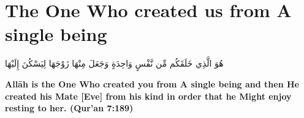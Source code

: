 \chapter{The One Who created us from A single being}
\begin{center}
    {\Huge    
        \begin{Arabic}
            هُوَ الَّذِي خَلَقَكُم مِّن نَّفْسٍ وَاحِدَةٍ وَجَعَلَ مِنْهَا زَوْجَهَا لِيَسْكُنَ إِلَيْهَا
        \end{Arabic}
    }    
\end{center}
\vspace*{\fill}
\vspace{3cm}
\begin{center}
    \large \textbf{Allāh is the One Who created you from A single being and then He created his Mate [Eve] from his kind in order that he Might enjoy resting to her. (Qur'an 7:189)}
\end{center}
